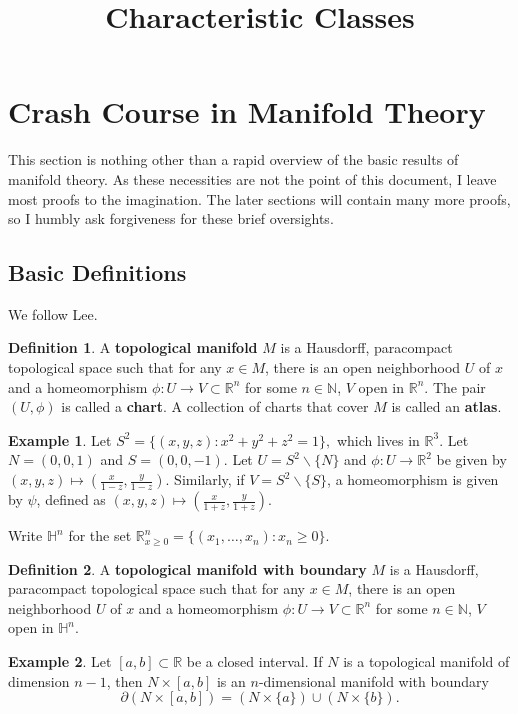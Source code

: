 \documentclass{article}
\title{Characteristic Classes}
\author{}
\date{}
\theoremstyle{definition}
\newtheorem{ex}{Example}[section]
\newtheorem{defn}{Definition}[section]
\newcommand{\N}{\mathbb{N}}
\newcommand{\R}{\mathbb{R}}
\begin{document}
\Large
\maketitle
\tableofcontents
\newpage

\section{Crash Course in Manifold Theory}
This section is nothing other than a rapid overview of the basic results of manifold theory. As these necessities are not the point of this document, I leave most proofs to the imagination. The later sections will contain many more proofs, so I humbly ask forgiveness for these brief oversights. 
\subsection{Basic Definitions}
We follow Lee\cite{Lee}.
\begin{defn}
A \textbf{topological manifold} $M$ is a Hausdorff, paracompact topological space such that for any $x\in M$, there is an open neighborhood $U$ of $x$ and a homeomorphism $\phi:U\rightarrow V\subset\R^{n}$ for some $n\in\N$, $V$ open in $\R^{n}.$
The pair $(U,\phi)$  is called a \textbf{chart}. A collection of charts that cover $M$ is called an \textbf{atlas}.
\end{defn}
\begin{ex}
Let $S^{2}=\{(x,y,z):x^{2}+y^{2}+z^{2}=1\},$ which lives in $\R^{3}.$ Let $N=(0,0,1)$ and $S=(0,0,-1)$. Let $U=S^{2}\backslash\{N\}$ and $\phi:U\rightarrow\R^{2}$ be given by $(x,y,z)\mapsto (\frac{x}{1-z},\frac{y}{1-z}).$ Similarly, if $V=S^{2}\backslash\{S\}$, a homeomorphism is given by $\psi$, defined as $(x,y,z)\mapsto (\frac{x}{1+z},\frac{y}{1+z})$.
\end{ex}

 Write $\mathbb{H}^{n}$ for the set $\R^{n}_{x\geq0}=\{(x_{1},\dots,x_{n}):x_{n}\geq0\}.$ 
\begin{defn}
A \textbf{topological manifold with boundary} $M$ is a Hausdorff, paracompact topological space such that for any $x\in M$, there is an open neighborhood $U$ of $x$ and a homeomorphism $\phi:U\rightarrow V\subset\R^{n}$ for some $n\in\N$, $V$ open in $\mathbb{H}^{n}$. 
\end{defn}
\begin{ex}
Let $[a,b]\subset\R$ be a closed interval. If $N$ is a topological manifold of dimension $n-1$, then $N\times[a,b]$ is an $n$-dimensional manifold with boundary
\[\partial(N\times[a,b])=(N\times\{a\})\cup(N\times\{b\}).\]
\end{ex}
\end{document}
